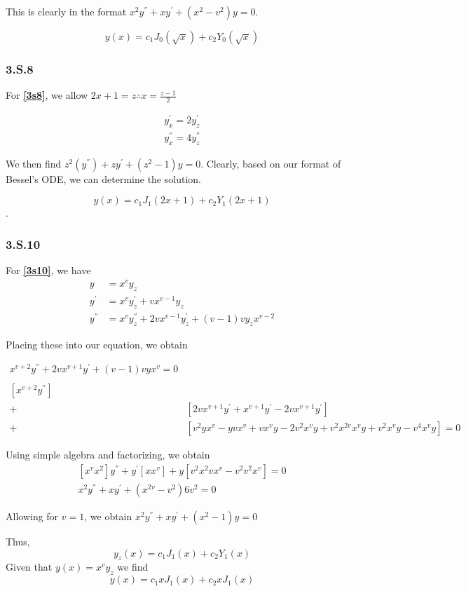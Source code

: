 \documentclass{article}
\begin{document}
This is clearly in the format $x^2y^{''}+xy^{'}+(x^2-v^2)y=0$.

$$y(x) = c_1 J_0 (\sqrt{x}) + c_2 Y_0 (\sqrt{x})$$
\par
\subsubsection*{3.S.8}

For \textbf{\ref{3s8}}, we allow $2x+1=z \therefore x=\frac{z-1}{2}$

\begin{align*}
y_x^{'} = 2y_z^{'}\\
y_x^{''} = 4y_z^{''}
\end{align*}

We then find $z^2(y^{''})+zy^{'}+(z^2-1)y = 0$.
Clearly, based on our format of Bessel's ODE, we can determine the solution.

$$y(x) = c_1 J_1 (2x+1) + c_2 Y_1 (2x+1)$$.
\par
\subsubsection*{3.S.10}

For \textbf{\ref{3s10}}, we have 
\begin{align*}
y &= x^vy_z\\
y^{'} &= x^vy_z^{'}+vx^{v-1}y_z\\
y^{''} &= x^vy_z^{''} + 2vx^{v-1}y_z^{'}+(v-1)vy_zx^{v-2}
\end{align*}

Placing these into our equation, we obtain

\begin{align*}
x^{v+2}y^{''} + 2vx^{v+1}y^{'} + (v-1)vyx^{v} = 0\\\\
\left[x^{v+2}y^{''}\right] & \\
+ &\left[2vx^{v+1}y^{'} + x^{v+1}y^{'} - 2vx^{v+1}y^{'} \right]\\
+ &\left[v^2yx^v - yvx^v + vx^vy - 2v^2x^vy + v^2x^{2v}x^vy + v^2x^vy - v^4x^vy \right] = 0
\end{align*}

Using simple algebra and factorizing, we obtain
\begin{align*}
\left[x^vx^2\right]y^{''}+y^{'}\left[xx^v\right]+y\left[v^2x^2vx^v-v^2v^2x^v\right] = 0\\
x^2y^{''}+xy^{'}+(x^{2v}-v^2)6v^2=0
\end{align*}

Allowing for $v=1$, we obtain $x^2y^{''}+xy^{'}+(x^2-1)y=0$

Thus,
\begin{equation*}
y_z(x) = c_1 J_1(x) + c_2 Y_1(x)
\end{equation*}
Given that $y(x) = x^v y_z$ we find
\begin{equation*}
y(x) = c_1 x J_1(x) + c_2 x J_1(x)
\end{equation*}
\end{document}
